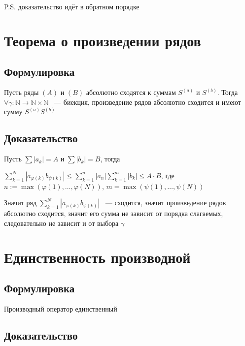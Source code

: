 \documentclass{article}
\begin{document}
            P.S. доказательство идёт в обратном порядке
            
    \newpage
    
    \section{Теорема о произведении рядов}
    
        \subsection{Формулировка}
        
            Пусть ряды $(A)$ и $(B)$ абсолютно сходятся к суммам $S^{(a)}$ и $S^{(b)}$. Тогда $\forall \gamma : \mathbb{N} \rightarrow \mathbb{N} \times \mathbb{N}$ ~--- биекция, произведение рядов абсолютно сходится и имеют сумму $S^{(a)} S^{(b)}$
            
        \subsection{Доказательство}
        
            Пусть $\sum |a_k| = A$ и $\sum |b_k| = B$, тогда
            
            $\sum\limits^N_{k = 1} |a_{\varphi(k)} b_{\psi(k)}| \leq \sum\limits^n_{k = 1} |a_n| \sum\limits^m_{k = 1} |b_k| \leq A \cdot B$, где $n := \max(\varphi(1), \ldots, \varphi(N))$, $m = \max(\psi(1), \ldots, \psi(N))$
            
            Значит ряд $\sum\limits^N_{k = 1} |a_{\varphi(k)} b_{\psi(k)}|$ ~--- сходится, значит произведение рядов абсолютно сходится, значит его сумма не зависит от порядка слагаемых, следовательно не зависит и от выбора $\gamma$
            
    \newpage
    
    \section{Единственность производной}
    
        \subsection{Формулировка}
        
            Производный оператор единственный
            
        \subsection{Доказательство}
        
\end{document}
